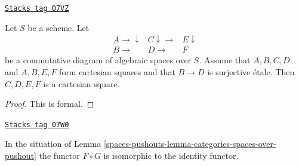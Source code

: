 \begin{lemma}[Diagram]
\label{spaces-pushouts-lemma-diagram}
\href{https://stacks.math.columbia.edu/tag/07VZ}{\texttt{Stacks tag 07VZ}}

Let $S$ be a scheme. Let
$$
\begin{array}{ccc}A \longrightarrow\downarrow & C \downarrow\longrightarrow & E \downarrow \\ B \longrightarrow & D \longrightarrow & F\end{array}
$$
be a commutative diagram of algebraic spaces over $S$.
Assume that $A, B, C, D$ and $A, B, E, F$ form cartesian squares
and that $B \to D$ is surjective \'etale.
Then $C, D, E, F$ is a cartesian square.
\end{lemma}

\begin{proof}
This is formal.
\end{proof}

\begin{lemma}
\label{spaces-pushouts-lemma-equivalence-categories-spaces-over-pushout}
\href{https://stacks.math.columbia.edu/tag/07W0}{\texttt{Stacks tag 07W0}}

In the situation of Lemma \ref{spaces-pushouts-lemma-categories-spaces-over-pushout}
the functor $F \circ G$ is isomorphic to the identity functor.
\end{lemma}

